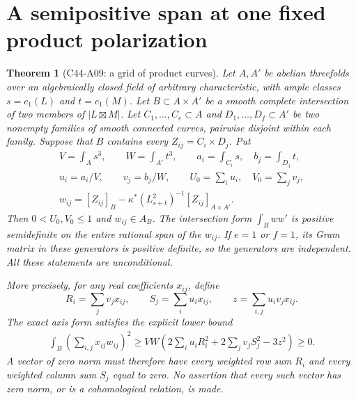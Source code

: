 \documentclass[11pt]{article}
\newtheorem{theorem}{Theorem}[section]
\theoremstyle{remark}\newtheorem{remark}[theorem]{Remark}
\begin{document}

\section{A semipositive span at one fixed product polarization}

\begin{theorem}[C44-A09: a grid of product curves]
Let $A,A'$ be abelian threefolds over an algebraically closed field
of arbitrary characteristic, with ample classes $s=c_1(L)$ and
$t=c_1(M)$. Let $B\subset A\times A'$ be a smooth complete
intersection of two members of $|L\boxtimes M|$.
Let $C_1,\ldots,C_e\subset A$ and $D_1,\ldots,D_f\subset A'$
be two nonempty families of smooth connected curves, pairwise
disjoint within each family. Suppose that $B$ contains every
$Z_{ij}=C_i\times D_j$. Put
\[
 \begin{gathered}
 V=\int_As^3,\qquad W=\int_{A'}t^3,\qquad
 a_i=\int_{C_i}s,\quad b_j=\int_{D_j}t,\\
 u_i=a_i/V,\qquad v_j=b_j/W,\qquad
 U_0=\sum_i u_i,\quad V_0=\sum_jv_j,\\
 w_{ij}=[Z_{ij}]_B-\kappa^*(L_{s+t}^2)^{-1}[Z_{ij}]_{A\times A'}.
 \end{gathered}
 \tag{C44.A09.1}
\]
Then $0<U_0,V_0\le1$ and $w_{ij}\in A_B$.
The intersection form $\int_Bww'$ is positive semidefinite on
the entire rational span of the $w_{ij}$. If $e=1$ or $f=1$, its
Gram matrix in these generators is positive definite, so the
generators are independent. All these statements are unconditional.

More precisely, for any real coefficients $x_{ij}$, define
\[
 R_i=\sum_jv_jx_{ij},\qquad
 S_j=\sum_i u_ix_{ij},\qquad
 z=\sum_{i,j}u_iv_jx_{ij}.
\]
The exact axis form satisfies the explicit lower bound
\[
 \begin{split}
 \int_B\left(\sum_{i,j}x_{ij}w_{ij}\right)^2
 \ge VW\left(2\sum_i u_iR_i^2+2\sum_jv_jS_j^2-3z^2\right)\ge0.
 \end{split}
 \tag{C44.A09.2}
\]
A vector of zero norm must therefore have every weighted row sum
$R_i$ and every weighted column sum $S_j$ equal to zero. No assertion
that every such vector has zero norm, or is a cohomological relation,
is made.
\end{theorem}
\end{document}
